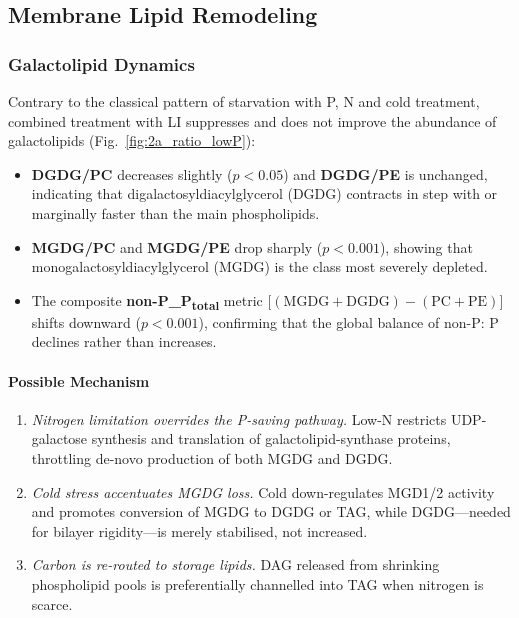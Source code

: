 \documentclass[10pt,letterpaper]{article}
\begin{document}
\subsection*{Membrane Lipid Remodeling}

\subsubsection*{Galactolipid Dynamics}

Contrary to the classical pattern of starvation with P, N and cold treatment, combined treatment with LI suppresses and does not improve the abundance of galactolipids (Fig.~\ref{fig:2a_ratio_lowP}):

\begin{itemize}
  \item \textbf{DGDG/PC} decreases slightly ($p<0.05$) and
        \textbf{DGDG/PE} is unchanged, indicating that digalactosyldiacylglycerol (DGDG) contracts in step with or marginally faster than the main phospholipids.
  \item \textbf{MGDG/PC} and \textbf{MGDG/PE} drop sharply
        ($p<0.001$), showing that
        monogalactosyldiacylglycerol (MGDG) is the class most severely depleted.
  \item The composite \textbf{ non-P_P\textsubscript{total}} metric
        \(\bigl[(\mathrm{MGDG}+\mathrm{DGDG})-(\mathrm{PC}+\mathrm{PE})\bigr]\)
        shifts downward ($p<0.001$), confirming that the global
balance of non-P: P declines rather than increases.
\end{itemize}

\paragraph{Possible Mechanism}
\begin{enumerate}
  \item \textit{Nitrogen limitation overrides the P-saving pathway.}  
        Low-N restricts UDP-galactose synthesis and translation of
        galactolipid-synthase proteins, throttling de-novo production of both
        MGDG and DGDG.
  \item \textit{Cold stress accentuates MGDG loss.}  
        Cold down-regulates MGD1/2 activity and promotes conversion of MGDG to
        DGDG or TAG, while DGDG—needed for bilayer rigidity—is merely
        stabilised, not increased.
  \item \textit{Carbon is re-routed to storage lipids.}  
        DAG released from shrinking phospholipid pools is preferentially
        channelled into TAG when nitrogen is scarce.
\end{enumerate}
\end{document}
